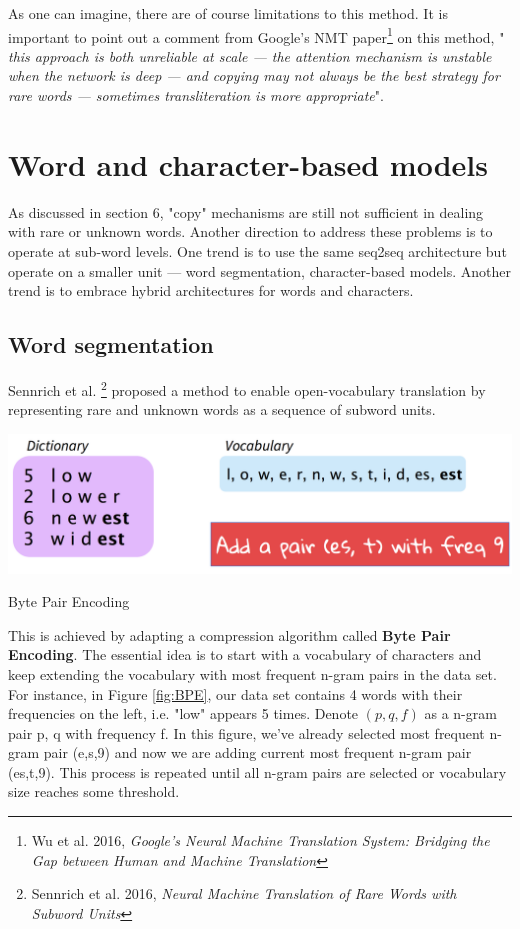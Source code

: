 \documentclass{tufte-handout}
\begin{document}
As one can imagine, there are of course limitations to this method. It is important to point out a comment from Google's NMT paper\footnote{Wu et al. 2016, \textit{Google's Neural Machine Translation System: Bridging the Gap
between Human and Machine Translation}} on this method, " \textit{this approach is both unreliable
at scale --- the attention mechanism is unstable when
the network is deep --- and copying may not always be
the best strategy for rare words --- sometimes
transliteration is more appropriate}". 



\section{Word and character-based models}
As discussed in section 6, "copy" mechanisms are still not sufficient in dealing with rare or unknown words. Another direction to address these problems is to operate at sub-word levels. One trend is to use the same seq2seq architecture but operate on a smaller unit --- word segmentation, character-based models. Another trend is to embrace hybrid architectures for words and characters.

\subsection{Word segmentation}
Sennrich et al. \footnote{Sennrich et al. 2016, \textit{Neural Machine Translation of Rare Words with Subword Units}} proposed a method to enable open-vocabulary translation by representing rare and unknown words as a sequence of subword units.

\begin{marginfigure}
	\centering
	\includegraphics[width=0.9\linewidth]{BPE.png}
	\caption {Byte Pair Encoding}
	\label{fig:BPE}
\end{marginfigure}

This is achieved by adapting a compression algorithm called \textbf{Byte Pair Encoding}. The essential idea is to start with a vocabulary of characters and keep extending the vocabulary with most frequent n-gram pairs in the data set. For instance, in Figure \ref{fig:BPE}, our data set contains 4 words with their frequencies on the left, i.e. "low" appears 5 times. Denote $(p,q,f)$ as a n-gram pair p, q with frequency f. In this figure, we've already selected most frequent n-gram pair (e,s,9) and now we are adding current most frequent n-gram pair (es,t,9). This process is repeated until all n-gram pairs are selected or vocabulary size reaches some threshold.
\end{document}
